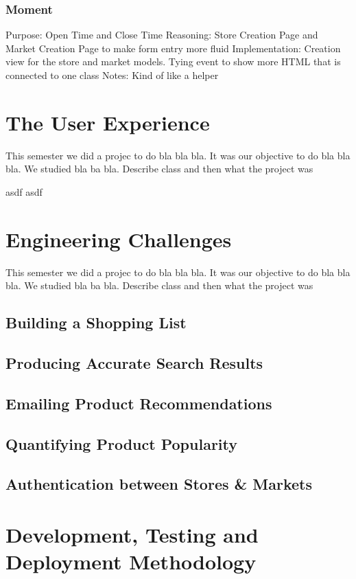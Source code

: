 \documentclass[10pt, a4paper, twocolumn]{article} %
\begin{document}
\subsubsection{Moment}
Purpose: Open Time and Close Time
Reasoning: Store Creation Page and Market Creation Page to make form entry more fluid 
Implementation: Creation view for the store and market models. Tying event to show more HTML that is connected to one class
Notes: Kind of like a helper
\section{The User Experience}

This semester we did a projec to do bla bla bla. It was our objective to do bla bla bla. We studied bla ba bla. Describe class and then what the project was

asdf
asdf
\section{Engineering Challenges}

This semester we did a projec to do bla bla bla. It was our objective to do bla bla bla. We studied bla ba bla. Describe class and then what the project was
\subsection{Building a Shopping List}
\subsection{Producing Accurate Search Results}
\subsection{Emailing Product Recommendations}
\subsection{Quantifying Product Popularity}
\subsection{Authentication between Stores & Markets}

\section{Development, Testing and Deployment Methodology}
\end{document}
